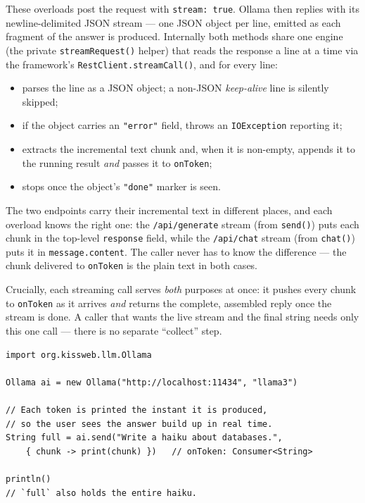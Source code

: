 \noindent
These overloads post the request with \texttt{stream:\ true}.  Ollama then replies with its newline-delimited JSON stream --- one JSON object per line, emitted as each fragment of the answer is produced.  Internally both methods share one engine (the private \texttt{streamRequest()} helper) that reads the response a line at a time via the framework's \texttt{RestClient.streamCall()}, and for every line:

\begin{itemize}
  \item parses the line as a JSON object; a non-JSON \emph{keep-alive} line is silently skipped;
  \item if the object carries an \texttt{"error"} field, throws an \texttt{IOException} reporting it;
  \item extracts the incremental text chunk and, when it is non-empty, appends it to the running result \emph{and} passes it to \texttt{onToken};
  \item stops once the object's \texttt{"done"} marker is seen.
\end{itemize}

\noindent
The two endpoints carry their incremental text in different places, and each overload knows the right one: the \texttt{/api/generate} stream (from \texttt{send()}) puts each chunk in the top-level \texttt{response} field, while the \texttt{/api/chat} stream (from \texttt{chat()}) puts it in \texttt{message.content}.  The caller never has to know the difference --- the chunk delivered to \texttt{onToken} is the plain text in both cases.

\noindent
Crucially, each streaming call serves \emph{both} purposes at once: it pushes every chunk to \texttt{onToken} as it arrives \emph{and} returns the complete, assembled reply once the stream is done.  A caller that wants the live stream and the final string needs only this one call --- there is no separate ``collect'' step.

\begin{lstlisting}[style=groovy]
import org.kissweb.llm.Ollama

Ollama ai = new Ollama("http://localhost:11434", "llama3")

// Each token is printed the instant it is produced,
// so the user sees the answer build up in real time.
String full = ai.send("Write a haiku about databases.",
    { chunk -> print(chunk) })   // onToken: Consumer<String>

println()
// `full` also holds the entire haiku.
\end{lstlisting}


